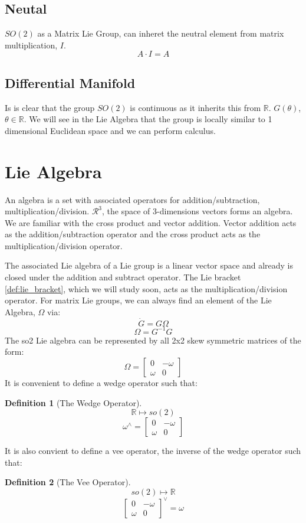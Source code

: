 \documentclass{book}
\newtheorem{definition}{Definition}
\begin{document}
\subsection*{Neutal}
%
$SO(2)$ as a Matrix Lie Group, can inheret the neutral element from matrix multiplication, $I$.
%
$$A\cdot I = A$$

\subsection*{Differential Manifold}
Is is clear that the group $SO(2)$ is continuous as it inherits this from $\mathbb{R}$.
$G(\theta)$, $\theta \in \mathbb{R}$.
We will see in the Lie Algebra that the group is locally similar to 1 dimensional Euclidean space
and we can perform calculus.


\section{Lie Algebra}
%
An algebra is a set with associated operators for addition/subtraction, multiplication/division.
$\mathcal{R}^3$, the space of 3-dimensions vectors forms an algebra. We are familiar with the cross product and vector addition.
Vector addition acts as the addition/subtraction operator and the cross product acts as the multiplication/division operator.

The associated Lie algebra of a Lie group is a linear vector space and already is closed under the addition and subtract operator.
The Lie bracket \cref{def:lie_bracket}, which we will study soon, acts as the multiplication/division operator.
%
For matrix Lie groups, we can always find an element of the Lie Algebra, $\Omega$ via:
%
$$\dot{G} = G\Omega$$
%
$$\Omega = G^{-1}\dot{G}$$
%
The so2 Lie algebra can be represented by all 2x2 skew symmetric matrices of the form:
%
$$\Omega = \begin{bmatrix}
0 & - \omega\\
\omega & 0
\end{bmatrix}$$
%
It is convenient to define a wedge operator such that:

\begin{definition}[The Wedge Operator]
$$\mathbb{R} \mapsto so(2)$$
$$\omega^{\wedge} = \begin{bmatrix}
    0 & - \omega\\
    \omega & 0
    \end{bmatrix}$$
\end{definition}
%
It is also convient to define a vee operator, the inverse of the wedge operator such that:
%
\begin{definition}[The Vee Operator]
$$so(2) \mapsto \mathbb{R}$$
$$\begin{bmatrix}
0 & - \omega\\
\omega & 0
\end{bmatrix}^{\vee} = \omega$$
\end{definition}
\end{document}
